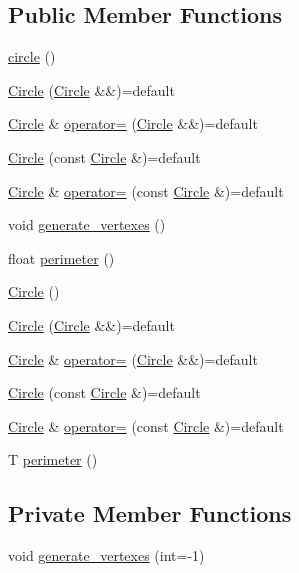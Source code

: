 \subsection*{Public Member Functions}
\begin{DoxyCompactItemize}
\item 
\mbox{\hyperlink{classCircle_aa019ad92cda5de45136856b99edd1894}{circle}} ()
\item 
\mbox{\hyperlink{classCircle_ad4ee8eadfd4201a937af204ac4e6ec37}{Circle}} (\mbox{\hyperlink{classCircle}{Circle}} \&\&)=default
\item 
\mbox{\hyperlink{classCircle}{Circle}} \& \mbox{\hyperlink{classCircle_a06c8a2624fa51b38023e0326e8ccf789}{operator=}} (\mbox{\hyperlink{classCircle}{Circle}} \&\&)=default
\item 
\mbox{\hyperlink{classCircle_a163162aa8beaceb25ebd9a17966f4bd5}{Circle}} (const \mbox{\hyperlink{classCircle}{Circle}} \&)=default
\item 
\mbox{\hyperlink{classCircle}{Circle}} \& \mbox{\hyperlink{classCircle_a0e3ef62951a8fccaf0635ea21ae73eca}{operator=}} (const \mbox{\hyperlink{classCircle}{Circle}} \&)=default
\item 
void \mbox{\hyperlink{classCircle_ab8336c9a74a6f3378c5243363f55cfc6}{generate\+\_\+vertexes}} ()
\item 
float \mbox{\hyperlink{classCircle_a6f066fc39c0de339b0498b04a56be028}{perimeter}} ()
\item 
\mbox{\hyperlink{classCircle_a0a298ea0e982a94a60091aeb2767f6e4}{Circle}} ()
\item 
\mbox{\hyperlink{classCircle_ad4ee8eadfd4201a937af204ac4e6ec37}{Circle}} (\mbox{\hyperlink{classCircle}{Circle}} \&\&)=default
\item 
\mbox{\hyperlink{classCircle}{Circle}} \& \mbox{\hyperlink{classCircle_a06c8a2624fa51b38023e0326e8ccf789}{operator=}} (\mbox{\hyperlink{classCircle}{Circle}} \&\&)=default
\item 
\mbox{\hyperlink{classCircle_a163162aa8beaceb25ebd9a17966f4bd5}{Circle}} (const \mbox{\hyperlink{classCircle}{Circle}} \&)=default
\item 
\mbox{\hyperlink{classCircle}{Circle}} \& \mbox{\hyperlink{classCircle_a0e3ef62951a8fccaf0635ea21ae73eca}{operator=}} (const \mbox{\hyperlink{classCircle}{Circle}} \&)=default
\item 
T \mbox{\hyperlink{classCircle_a6f066fc39c0de339b0498b04a56be028}{perimeter}} ()
\end{DoxyCompactItemize}
\subsection*{Private Member Functions}
\begin{DoxyCompactItemize}
\item 
void \mbox{\hyperlink{classCircle_a07ce44d6b3a70ee7cbcf19e02e50c361}{generate\+\_\+vertexes}} (int=-\/1)
\end{DoxyCompactItemize}
